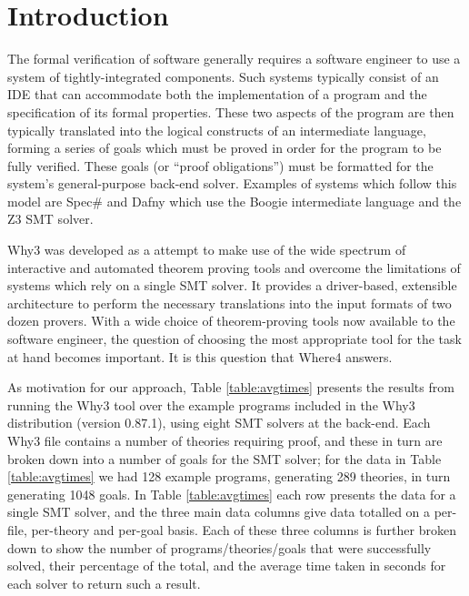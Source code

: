 \documentclass[runningheads,a4paper]{llncs}
\begin{document}
\section{Introduction}

\label{sec:intro}

The formal verification of software generally requires a software engineer to use a system of tightly-integrated components. Such systems typically consist of an IDE that can accommodate both the implementation of a program and the specification of its formal properties. 
These two aspects of the program are then typically translated into the logical constructs of an intermediate language, forming a series of goals which must be proved in order for the program to be fully verified. These goals (or ``proof obligations'') must be formatted for the system's general-purpose back-end solver. Examples of systems which follow this model are Spec\# \cite{spec} and Dafny \cite{Dafny} which use the Boogie \cite{Boogie} intermediate language and the Z3 \cite{Z3} SMT solver. 

\textsf{\textsf{Why3}} \cite{why:shephard} was developed as a attempt to make use of the wide spectrum of interactive and automated theorem proving tools and overcome the limitations of systems which rely on a single SMT solver. It provides a driver-based, extensible architecture to perform the necessary translations into the input formats of two dozen provers. With a wide choice of theorem-proving tools now available to the software engineer, the question of choosing the most appropriate tool for the task at hand becomes important. It is this question that \textsf{Where4} answers.

As motivation for our approach, Table \ref{table:avgtimes} presents the results from running the \textsf{Why3} tool over the example programs included in the \textsf{Why3} distribution (version 0.87.1), using eight SMT solvers at the back-end.  
Each \textsf{Why3} file contains a number of theories requiring proof, and these in turn are  broken down into a number of goals for the SMT solver; for the data in Table \ref{table:avgtimes} we had 128 example programs, generating 289 theories, in turn generating 1048 goals.  In Table \ref{table:avgtimes} each row presents the data for a single SMT solver, and the three main data columns give data totalled on a per-file, per-theory and per-goal basis.  Each of these three columns is further broken down to show the number of programs/theories/goals that were successfully solved, their percentage of the total, and the average time taken in seconds for each solver to return such a result.
\end{document}
